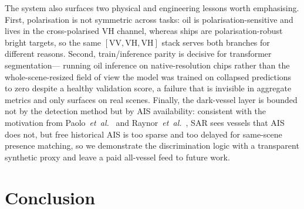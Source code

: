 \documentclass[a4paper,11pt]{article}
\begin{document}
The system also surfaces two physical and engineering lessons worth emphasising. First,
polarisation is not symmetric across tasks: oil is polarisation-sensitive and lives in
the cross-polarised VH channel, whereas ships are polarisation-robust bright targets, so
the same $[\text{VV},\text{VH},\text{VH}]$ stack serves both branches for different
reasons. Second, train/inference parity is decisive for transformer segmentation---
running oil inference on native-resolution chips rather than the whole-scene-resized field
of view the model was trained on collapsed predictions to zero despite a healthy
validation score, a failure that is invisible in aggregate metrics and only surfaces on
real scenes. Finally, the dark-vessel layer is bounded not by the detection method but by
AIS availability: consistent with the motivation from
Paolo~\textit{et~al.}~\cite{paolo2024nature} and
Raynor~\textit{et~al.}~\cite{raynor2025science}, SAR sees vessels that AIS does not, but
free historical AIS is too sparse and too delayed for same-scene presence matching, so we
demonstrate the discrimination logic with a transparent synthetic proxy and leave a paid
all-vessel feed to future work.

\section{Conclusion}
\end{document}
